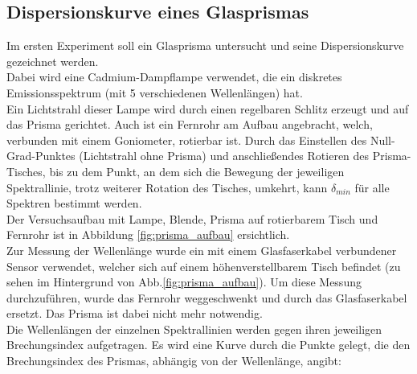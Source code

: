 \documentclass[12pt,a4paper]{article}
\begin{document}
\pagebreak
\setlength{\columnsep}{20pt}
\begin{multicols}{2}


%

\section{Dispersionskurve eines Glasprismas}
Im ersten Experiment soll ein Glasprisma untersucht und seine Dispersionskurve gezeichnet werden.\\
Dabei wird eine Cadmium-Dampflampe verwendet, die ein diskretes Emissionsspektrum (mit 5 verschiedenen Wellenlängen) hat.\\
Ein Lichtstrahl dieser Lampe wird durch einen regelbaren Schlitz erzeugt und auf das Prisma gerichtet. Auch ist ein Fernrohr am Aufbau angebracht, welch, verbunden mit einem Goniometer, rotierbar ist. 
Durch das Einstellen des Null-Grad-Punktes (Lichtstrahl ohne Prisma) und anschließendes Rotieren des Prisma-Tisches, bis zu dem Punkt, an dem sich die Bewegung der jeweiligen Spektrallinie, trotz weiterer Rotation des Tisches, umkehrt, kann $\delta_{min}$ für alle Spektren bestimmt werden. \\
Der Versuchsaufbau mit Lampe, Blende, Prisma auf rotierbarem Tisch und Fernrohr ist in Abbildung \ref{fig:prisma_aufbau} ersichtlich.\\
Zur Messung der Wellenlänge wurde ein mit einem Glasfaserkabel verbundener Sensor verwendet, welcher sich auf einem höhenverstellbarem Tisch befindet (zu sehen im Hintergrund von Abb.\ref{fig:prisma_aufbau}). Um diese Messung durchzuführen, wurde das Fernrohr weggeschwenkt und durch das Glasfaserkabel ersetzt. Das Prisma ist dabei nicht mehr notwendig.
\\ 
Die Wellenlängen der einzelnen Spektrallinien werden gegen ihren jeweiligen Brechungsindex aufgetragen. Es wird eine Kurve durch die Punkte gelegt, die den Brechungsindex des Prismas, abhängig von der Wellenlänge, angibt:


\end{multicols}
\end{document}

